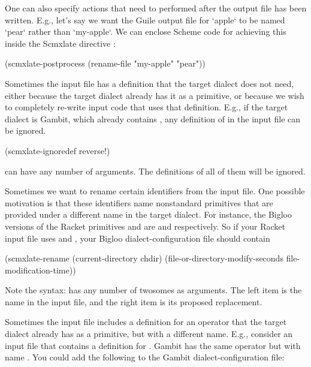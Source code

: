One can also specify actions that need to performed
after the output file has been written.  E.g., let’s say
we want the Guile output file for `apple` to be
named `pear` rather than `my-apple`.  We can
enclose Scheme code for achieving this inside the
Scmxlate directive :

\begintts
(scmxlate-postprocess
  (rename-file "my-apple" "pear"))
\endtt


Sometimes the input file has a definition that the
target dialect does not need, either because the target
dialect already has it as a primitive, or because we
wish to completely re-write input code that uses that
definition.  E.g., if the target dialect is Gambit,
which already contains , any definition of
 in the input file can be ignored.

\begintts
(scmxlate-ignoredef reverse!)
\endtt

 can have any number of
arguments.  The definitions of all of them will be
ignored.


Sometimes we want to rename certain identifiers from
the input file.  One possible motivation is that
these identifiers name nonstandard primitives that are
provided under a different name in the target dialect.
For instance, the Bigloo versions of the Racket
primitives  and
 are  and
 respectively.  So if your
Racket input file uses  and
, your Bigloo
dialect-configuration file should contain

\begintts
(scmxlate-rename
 (current-directory chdir)
 (file-or-directory-modify-seconds file-modification-time))
\endtt

Note the syntax:  has any number of
twosomes as arguments.  The left item is the name in
the input file, and the right item is its proposed
replacement.


Sometimes the input file includes a definition
for an operator that the target dialect already has as
a primitive, but with a different name.   E.g., consider
an input file that contains a definition for
.  Gambit has the same operator but with
name .  You could add the following to
the Gambit dialect-configuration file:

